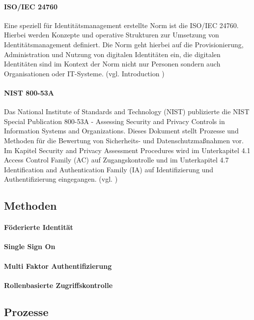 \documentclass[11pt]{article}
\begin{document}
\paragraph{ISO/IEC 24760}
Eine speziell für Identitätsmanagement erstellte Norm ist die ISO/IEC 24760. Hierbei werden Konzepte und operative Strukturen zur Umsetzung von Identitätsmanagement definiert. Die Norm geht hierbei auf die Provisionierung, Administration und Nutzung von digitalen Identitäten ein, die digitalen Identitäten sind im Kontext der Norm nicht nur Personen sondern auch Organisationen oder IT-Systeme. (vgl. \cite{iso2019idm} \glqq{}Introduction \grqq{})
\paragraph{NIST 800-53A}
Das National Institute of Standards and Technology (NIST) publizierte die \glqq{}NIST Special Publication 800-53A - Assessing Security and Privacy Controls in Information Systems and Organizations\grqq{}. Dieses Dokument stellt Prozesse und Methoden für die Bewertung von Sicherheits- und Datenschutzmaßnahmen vor. Im Kapitel \glqq{}Security and Privacy Assessment Procedures\grqq{} wird im Unterkapitel 4.1 \glqq{}Access Control Family (AC)\grqq{} auf Zugangskontrolle und im Unterkapitel 4.7 \glqq{}Identification and Authentication Family (IA)\grqq{} auf Identifizierung und Authentifizierung eingegangen. (vgl. \cite{nist202280053a})
\subsection{Methoden}
\paragraph{Föderierte Identität}
\paragraph{Single Sign On}
\paragraph{Multi Faktor Authentifizierung}
\paragraph{Rollenbasierte Zugriffskontrolle}
\subsection{Prozesse}
\end{document}
